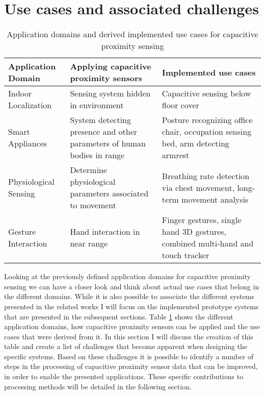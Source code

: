 \section{Use cases and associated challenges}
\begin{table}[htbp]
  \centering
  \caption{Application domains and derived implemented use cases for capacitive proximity sensing}
    \begin{tabularx}{\linewidth}{p{3.5cm}XX}
    \toprule
    Application Domain & Applying capacitive proximity sensors & Implemented use cases \\
    \midrule
    Indoor Localization & Sensing system hidden in environment & Capacitive sensing below floor cover \\
    Smart Appliances & System detecting presence and other parameters of human bodies in range & Posture recognizing office chair, occupation sensing bed, arm detecting armrest \\
    Physiological Sensing & Determine physiological parameters associated to movement & Breathing rate detection via chest movement, long-term movement analysis \\
    Gesture Interaction & Hand interaction in near range & Finger gestures, single hand 3D gestures, combined multi-hand and touch tracker \\
    \bottomrule
    \end{tabularx}%
  \label{tab:usecase_list}%
\end{table}%

Looking at the previously defined application domains for capacitive proximity sensing we can have a closer look and think about actual use cases that belong in the different domains. While it is also possible to associate the different systems presented in the related works I will focus on the implemented prototype systems that are presented in the subsequent sections. Table \ref{tab:usecase_list} shows the different application domains, how capacitive proximity sensors can be applied and the use cases that were derived from it. In this section I will discuss the creation of this table and create a list of challenges that become apparent when designing the specific systems. Based on these challenges it is possible to identify a number of steps in the processing of capacitive proximity sensor data that can be improved, in order to enable the presented applications. These specific contributions to processing methods will be detailed in the following section.

